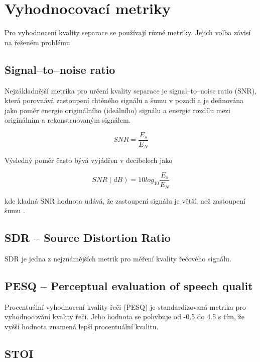 \section{Vyhodnocovací metriky}
Pro vyhodnocení kvality separace se používají různé metriky. Jejich volba závisí na řešeném problému.


\subsection{Signal--to--noise ratio}
Nejzákladnější metrika pro určení kvality separace je signal--to--noise ratio (SNR), která porovnává zastoupení chtěného signálu a šumu v pozadí a je definována jako poměr energie originálního (ideálního) signálu a energie rozdílu mezi originálním a rekonstruovaným signálem.

\begin{equation}
  SNR = \frac{E_s}{E_N}
\end{equation}

Výsledný poměr často bývá vyjádřen v decibelech jako

\begin{equation}
  SNR(dB) = 10log_{10}\frac{E_s}{E_N}
\end{equation}

kde kladná SNR hodnota udává, že zastoupení signálu je větší, než zastoupení šumu .



\subsection{SDR -- Source Distortion Ratio}
SDR je jedna z nejznámějších metrik pro měření kvality řečového signálu.


\subsection{PESQ -- Perceptual evaluation of speech qualit}
Procentuální vyhodnocení kvality řeči (PESQ\cite{pesq-itut}) je standardizovaná metrika pro vyhodnocování kvality řeči. Jeho hodnota se pohybuje od -0.5 do 4.5 s tím, že vyšší hodnota znamená lepší procentuální kvalitu\cite{DBLP:journals/corr/abs-1901-09146}.


\subsection{STOI}


